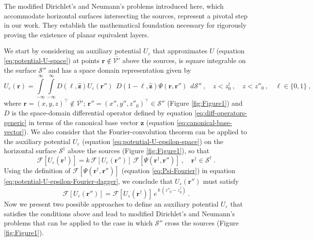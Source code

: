 \documentclass[manuscript,noblind]{geophysics}
\begin{document}
	The modified Dirichlet’s and Neumann’s problems introduced here, 
	which accommodate horizontal surfaces intersecting the sources, represent a pivotal step in our work. 
	They establish the mathematical foundation necessary for rigorously proving the existence of planar equivalent layers.
	
	We start by considering an auxiliary potential $U_{\varepsilon}$ that approximates $U$ (equation \ref{eq:potential-U-space})
	at points $\mathbf{r} \notin \overline{\mathcal{V}'}$ above the sources, is square integrable on the surface 
	$\mathcal{S}''$ and has a space domain representation given by 
	\begin{equation}
		U_{\varepsilon}(\mathbf{r}) = 
		\int\limits_{-\infty}^{\infty} \int\limits_{-\infty}^{\infty}
		D(\ell, \hat{\mathbf{z}}) U_{\varepsilon}(\mathbf{r}'') \:\:
		D(1-\ell, \hat{\mathbf{z}}) \Psi(\mathbf{r}, \mathbf{r}'') 
		\:\: d\mathcal{S}'' \: , 
		\quad z < z^{t}_{0} \: , \quad z < z''_{0} \: ,
		\quad \ell \in \{ 0, 1 \} \: ,
		\label{eq:potential-U-epsilon-space}
	\end{equation}
	where $\mathbf{r} = (x, y, z)^{\top} \notin \overline{\mathcal{V}'}$; 
	$\mathbf{r}'' = (x'', y'', z''_{0})^{\top} \in \mathcal{S}''$ (Figure \ref{fig:Figure1}) and 
	$D$ is the space-domain differential operator 
	defined by equation \ref{eq:diff-operators-generic} in terms of the canonical base vector 
	$\hat{\mathbf{z}}$ (equation \ref{eq:canonical-base-vector}).
	We also consider that the Fourier-convolution theorem 
	can be applied to the auxiliary potential $U_{\varepsilon}$
	(equation \ref{eq:potential-U-epsilon-space}) on the horizontal surface $\mathcal{S}^{\dagger}$ above
	the sources (Figure \ref{fig:Figure1}), so that
	\begin{equation}
		\mathcal{F} [ U_{\varepsilon}(\mathbf{r}^{\dagger}) ]
		= k \, \mathcal{F} [ U_{\varepsilon}(\mathbf{r}'') ] \:
		\mathcal{F} [ \Psi(\mathbf{r}^{\dagger}, \mathbf{r}'') ] \: ,
		\quad \mathbf{r}^{\dagger} \in \mathcal{S}^{\dagger} \: .
		\label{eq:potential-U-epsilon-Fourier-dagger}
	\end{equation}
	Using the definition of $\mathcal{F} [ \Psi(\mathbf{r}^{\dagger}, \mathbf{r}'') ]$ (equation \ref{eq:Psi-Fourier})
	in equation \ref{eq:potential-U-epsilon-Fourier-dagger}, we conclude that $U_{\varepsilon}(\mathbf{r}'')$ 
	must satisfy
	\begin{equation}
		\mathcal{F} [ U_{\varepsilon}(\mathbf{r}'') ] = 
		\mathcal{F} [ U_{\varepsilon}(\mathbf{r}^{\dagger}) ] \, e^{\, k \, (z''_{0} - z^{\dagger}_{0})} \: .
		\label{eq:potential-U-epsilon-Fourier-layer}
	\end{equation}
	Now we present two possible approaches to define an auxiliary potential $U_{\varepsilon}$ that satisfies the 
	conditions above and lead to modified Dirichlet’s and Neumann’s problems that can be applied to 
	the case in which $\mathcal{S}''$ cross the sources (Figure \ref{fig:Figure1}). 
	
\end{document}
